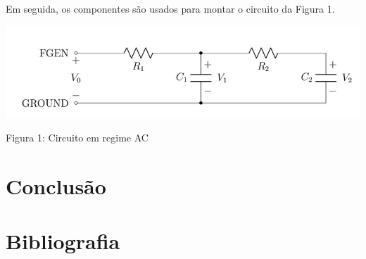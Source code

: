 \documentclass[a4 paper]{article}
\begin{document}
Em seguida, os componentes são usados para montar o circuito da Figura 1.

\begin{table}[h]
\centering
\includegraphics[scale=0.7]{figuras/figura1}
\end{table}

\begin{center}
Figura 1: Circuito em regime AC
\end{center}

\section{Conclusão}

\section{Bibliografia}
\end{document}
